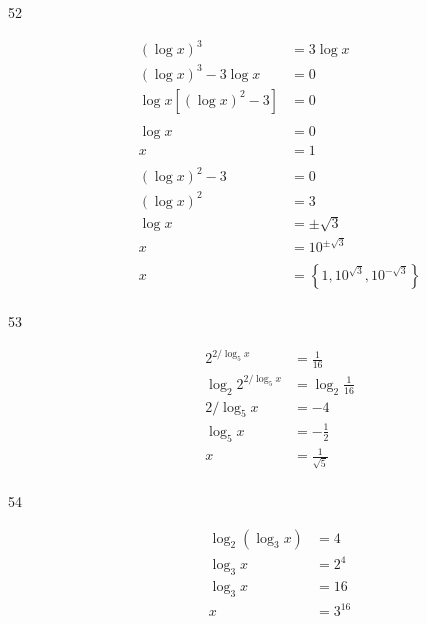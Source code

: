\documentclass{exam}
\begin{document}
      \begin{description}
        \item[52] 
          \begin{align*}
            (\log x)^3                &= 3 \log x \\
            (\log x)^3 - 3 \log x     &= 0 \\
            \log x \left[(\log x)^2 - 3 \right] &= 0 \\
            \\
            \log x &= 0 \\
            x      &= 1 \\
            \\
            (\log x)^2 - 3 &= 0 \\
            (\log x)^2     &= 3 \\
            \log x         &= \pm \sqrt{3} \\
            x              &= 10^{\pm \sqrt{3}} \\
            \\
            x &= \boxed{\left\{ 1, 10^{\sqrt{3}}, 10^{ - \sqrt{3}} \right\} } \\
          \end{align*}
          
        \item[53] 
          \begin{align*}
            2^{2/\log_5 x}        &= \frac{1}{16} \\
            \log_2 2^{2/\log_5 x} &= \log_2 \frac{1}{16} \\
            2/\log_5 x            &= - 4 \\
            \log_5x               &= - \frac{1}{2} \\
            x                     &= \boxed{\frac{1}{\sqrt{5}}} \\
          \end{align*}

        \item[54] 
          \begin{align*}
            \log_2 (\log_3 x) &= 4 \\
            \log_3 x          &= 2^4 \\
            \log_3 x          &= 16 \\
            x                 &= \boxed{3^{16}} \\
          \end{align*}

      \end{description}
    \fi
\end{document}

